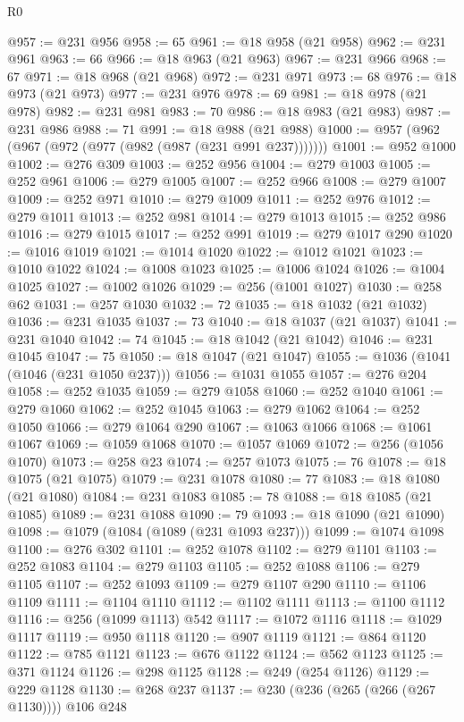 \begin{lexlean}{R0}
\begin{coremodule}
@957 := @231 @956
@958 := 65
@961 := @18 @958 (@21 @958)
@962 := @231 @961
@963 := 66
@966 := @18 @963 (@21 @963)
@967 := @231 @966
@968 := 67
@971 := @18 @968 (@21 @968)
@972 := @231 @971
@973 := 68
@976 := @18 @973 (@21 @973)
@977 := @231 @976
@978 := 69
@981 := @18 @978 (@21 @978)
@982 := @231 @981
@983 := 70
@986 := @18 @983 (@21 @983)
@987 := @231 @986
@988 := 71
@991 := @18 @988 (@21 @988)
@1000 := @957 (@962 (@967 (@972 (@977 (@982 (@987 (@231 @991 @237)))))))
@1001 := @952 @1000
@1002 := @276 @309
@1003 := @252 @956
@1004 := @279 @1003
@1005 := @252 @961
@1006 := @279 @1005
@1007 := @252 @966
@1008 := @279 @1007
@1009 := @252 @971
@1010 := @279 @1009
@1011 := @252 @976
@1012 := @279 @1011
@1013 := @252 @981
@1014 := @279 @1013
@1015 := @252 @986
@1016 := @279 @1015
@1017 := @252 @991
@1019 := @279 @1017 @290
@1020 := @1016 @1019
@1021 := @1014 @1020
@1022 := @1012 @1021
@1023 := @1010 @1022
@1024 := @1008 @1023
@1025 := @1006 @1024
@1026 := @1004 @1025
@1027 := @1002 @1026
@1029 := @256 (@1001 @1027)
@1030 := @258 @62
@1031 := @257 @1030
@1032 := 72
@1035 := @18 @1032 (@21 @1032)
@1036 := @231 @1035
@1037 := 73
@1040 := @18 @1037 (@21 @1037)
@1041 := @231 @1040
@1042 := 74
@1045 := @18 @1042 (@21 @1042)
@1046 := @231 @1045
@1047 := 75
@1050 := @18 @1047 (@21 @1047)
@1055 := @1036 (@1041 (@1046 (@231 @1050 @237)))
@1056 := @1031 @1055
@1057 := @276 @204
@1058 := @252 @1035
@1059 := @279 @1058
@1060 := @252 @1040
@1061 := @279 @1060
@1062 := @252 @1045
@1063 := @279 @1062
@1064 := @252 @1050
@1066 := @279 @1064 @290
@1067 := @1063 @1066
@1068 := @1061 @1067
@1069 := @1059 @1068
@1070 := @1057 @1069
@1072 := @256 (@1056 @1070)
@1073 := @258 @23
@1074 := @257 @1073
@1075 := 76
@1078 := @18 @1075 (@21 @1075)
@1079 := @231 @1078
@1080 := 77
@1083 := @18 @1080 (@21 @1080)
@1084 := @231 @1083
@1085 := 78
@1088 := @18 @1085 (@21 @1085)
@1089 := @231 @1088
@1090 := 79
@1093 := @18 @1090 (@21 @1090)
@1098 := @1079 (@1084 (@1089 (@231 @1093 @237)))
@1099 := @1074 @1098
@1100 := @276 @302
@1101 := @252 @1078
@1102 := @279 @1101
@1103 := @252 @1083
@1104 := @279 @1103
@1105 := @252 @1088
@1106 := @279 @1105
@1107 := @252 @1093
@1109 := @279 @1107 @290
@1110 := @1106 @1109
@1111 := @1104 @1110
@1112 := @1102 @1111
@1113 := @1100 @1112
@1116 := @256 (@1099 @1113) @542
@1117 := @1072 @1116
@1118 := @1029 @1117
@1119 := @950 @1118
@1120 := @907 @1119
@1121 := @864 @1120
@1122 := @785 @1121
@1123 := @676 @1122
@1124 := @562 @1123
@1125 := @371 @1124
@1126 := @298 @1125
@1128 := @249 (@254 @1126)
@1129 := @229 @1128
@1130 := @268 @237
@1137 := @230 (@236 (@265 (@266 (@267 @1130)))) @106 @248

\end{coremodule}
\end{lexlean}
